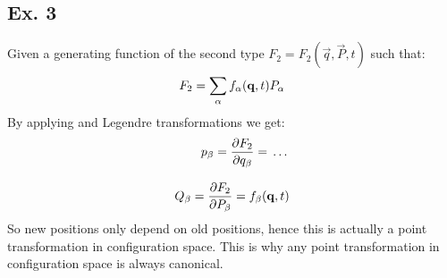 \subsection{Ex. 3}
Given a generating function of the second type $F_2 = F_2(\vec{q},\vec{P},t)$ such that:
\begin{equation}
    F_2 = \displaystyle\sum_{\alpha} f_{\alpha}(\vb{q},t) P_{\alpha}
\end{equation}
By applying \hamiltonref\;and Legendre transformations we get:
\begin{equation}
    \begin{split}
        p_{\beta} = \pdv{F_2}{q_{\beta}} =  \,\dots\, \\[8pt]
        Q_{\beta} = \pdv{F_2}{P_{\beta}} = f_{\beta}(\vec{q},t)
    \end{split}
\end{equation}
So new positions only depend on old positions, hence this is actually a point transformation in configuration space. This is why any point transformation in configuration space is always canonical.

